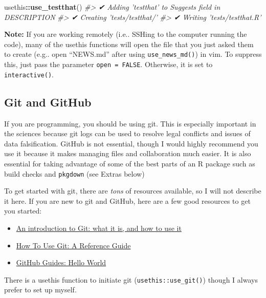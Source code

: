 \documentclass[]{book}
\newenvironment{Shaded}{\begin{snugshade}}{\end{snugshade}}
\newcommand{\CommentTok}[1]{\textcolor[rgb]{0.56,0.35,0.01}{\textit{#1}}}
\newcommand{\KeywordTok}[1]{\textcolor[rgb]{0.13,0.29,0.53}{\textbf{#1}}}
\newcommand{\NormalTok}[1]{#1}
\newcommand{\OperatorTok}[1]{\textcolor[rgb]{0.81,0.36,0.00}{\textbf{#1}}}
\providecommand{\tightlist}{%
  \setlength{\itemsep}{0pt}\setlength{\parskip}{0pt}}
\begin{document}
\begin{Shaded}
\begin{Highlighting}[]
\NormalTok{usethis}\OperatorTok{::}\KeywordTok{use_testthat}\NormalTok{()}
\CommentTok{#> ✔ Adding 'testthat' to Suggests field in DESCRIPTION}
\CommentTok{#> ✔ Creating 'tests/testthat/'}
\CommentTok{#> ✔ Writing 'tests/testthat.R'}
\end{Highlighting}
\end{Shaded}

\textbf{Note:} If you are working remotely (i.e.. SSHing to the computer running the code), many of the usethis functions will open the file that you just asked them to create (e.g.. open ``NEWS.md'' after using \texttt{use\_news\_md()}) in vim. To suppress this, just pass the parameter \texttt{open\ =\ FALSE}. Otherwise, it is set to \texttt{interactive()}.

\hypertarget{git-and-github}{%
\subsection{Git and GitHub}\label{git-and-github}}

If you are programming, you should be using git. This is especially important in the sciences because git logs can be used to resolve legal conflicts and issues of data falsification. GitHub is not essential, though I would highly recommend you use it because it makes managing files and collaboration much easier. It is also essential for taking advantage of some of the best parts of an R package such as build checks and \texttt{pkgdown} (see Extras below)

To get started with git, there are \emph{tons} of resources available, so I will not describe it here. If you are new to git and GitHub, here are a few good resources to get you started:

\begin{itemize}
\tightlist
\item
  \href{https://medium.freecodecamp.org/what-is-git-and-how-to-use-it-c341b049ae61}{An introduction to Git: what it is, and how to use it}
\item
  \href{https://www.digitalocean.com/community/tutorials/how-to-use-git-a-reference-guide}{How To Use Git: A Reference Guide}
\item
  \href{https://guides.github.com/activities/hello-world/}{GitHub Guides: Hello World}
\end{itemize}

There is a usethis function to initiate git (\texttt{usethis::use\_git()}) though I always prefer to set up myself.
\end{document}
